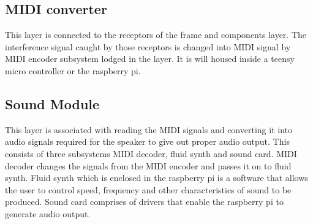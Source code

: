 \subsection{MIDI converter}
This layer is connected to the receptors of the frame and components layer. The interference signal caught by those receptors is changed into MIDI signal by MIDI encoder subsystem lodged in the layer. It is will housed inside a teensy micro controller or the raspberry pi.

\subsection{Sound Module}
This layer is associated with reading the MIDI signals and converting it into audio signals required for the speaker to give out proper audio output. This consists of three subsystems MIDI decoder, fluid synth and sound card. MIDI decoder changes the signals from the MIDI encoder and passes it on to fluid synth. Fluid synth which is enclosed in the raspberry pi is a software that allows the user to control speed, frequency and other characteristics of sound to be produced. Sound card comprises of drivers that enable the raspberry pi to generate audio output.

